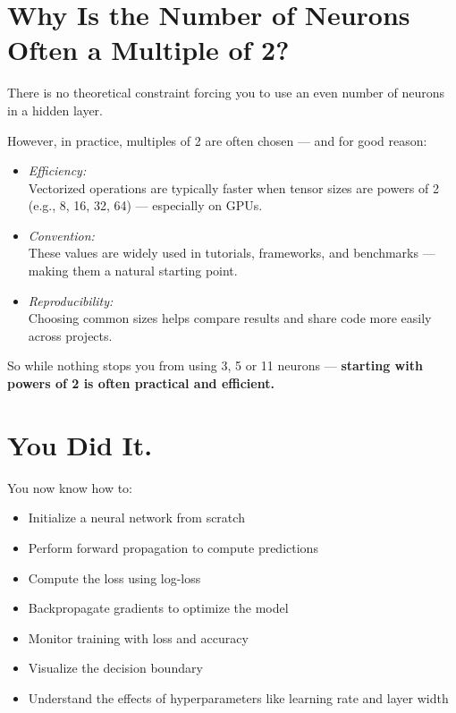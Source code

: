 \documentclass[11pt]{article}
\begin{document}
\section*{Why Is the Number of Neurons Often a Multiple of 2?}

There is no theoretical constraint forcing you to use an even number of neurons in a hidden layer.

However, in practice, multiples of 2 are often chosen — and for good reason:

\begin{itemize}
    \item \textit{Efficiency:} \\
    Vectorized operations are typically faster when tensor sizes are powers of 2 (e.g., 8, 16, 32, 64) — especially on GPUs.

    \item \textit{Convention:} \\
    These values are widely used in tutorials, frameworks, and benchmarks — making them a natural starting point.

    \item \textit{Reproducibility:} \\
    Choosing common sizes helps compare results and share code more easily across projects.
\end{itemize}

\noindent So while nothing stops you from using 3, 5 or 11 neurons —  
\textbf{starting with powers of 2 is often practical and efficient.}

\bigskip

\section*{You Did It.}

You now know how to:
\begin{itemize}
    \item Initialize a neural network from scratch
    \item Perform forward propagation to compute predictions
    \item Compute the loss using log-loss
    \item Backpropagate gradients to optimize the model
    \item Monitor training with loss and accuracy
    \item Visualize the decision boundary
    \item Understand the effects of hyperparameters like learning rate and layer width
\end{itemize}
\end{document}
